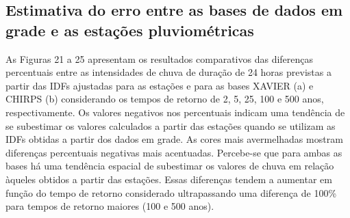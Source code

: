\documentclass[
]{agujournal2019}
\begin{document}
\subsection{Estimativa do erro entre as bases de dados em grade e as
estações
pluviométricas}\label{estimativa-do-erro-entre-as-bases-de-dados-em-grade-e-as-estauxe7uxf5es-pluviomuxe9tricas-1}

As Figuras 21 a 25 apresentam os resultados comparativos das diferenças
percentuais entre as intensidades de chuva de duração de 24 horas
previstas a partir das IDFs ajustadas para as estações e para as bases
XAVIER (a) e CHIRPS (b) considerando os tempos de retorno de 2, 5, 25,
100 e 500 anos, respectivamente. Os valores negativos nos percentuais
indicam uma tendência de se subestimar os valores calculados a partir
das estações quando se utilizam as IDFs obtidas a partir dos dados em
grade. As cores mais avermelhadas mostram diferenças percentuais
negativas mais acentuadas. Percebe-se que para ambas as bases há uma
tendência espacial de subestimar os valores de chuva em relação àqueles
obtidos a partir das estações. Essas diferenças tendem a aumentar em
função do tempo de retorno considerado ultrapassando uma diferença de
100\% para tempos de retorno maiores (100 e 500 anos).
\end{document}
